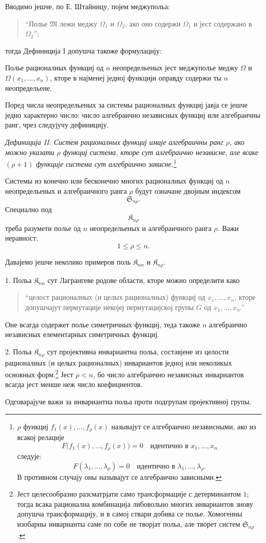 ﻿\documentclass[11pt]{article}
\providecommand{\Kfield}{\mathfrak{K}}
\providecommand{\Ssys}{\mathfrak{S}}
\providecommand{\Mfield}{\mathfrak{M}}
\begin{document}
Вводимо јешче, по Е. Штайницу, појем меджупольа:
\begin{quote}
``Полье $\Mfield$ лежи меджу $\Omega_1$ и $\Omega_2$, ако оно содержи $\Omega_1$ и јест содержано в $\Omega_2$'';
\end{quote}
тогда Дефиниција I допушча такоже формулацију:

Полье рационалных функциј од $n$ неопредельеных јест меджуполье меджу $\Omega$ и $\Omega(x_1,\ldots,x_n)$, кторе в најменеј једној функцији оправду содержи ты $n$ неопредельене.

Поред числа неопредельеных за системы рационалных функциј јавја се јешче једно характерно число: число алгебраично независных функциј или алгебраичны ранг, чрез следујучу дефиницију.

{\itshape Дефиниција II: Систем рационалных функциј имаје алгебраичны ранг $\rho$, ако можно указати $\rho$ функциј система, кторе сут алгебраично независне, але всаке $(\rho+1)$ функције система сут алгебраично зависне.}\footnote{$\rho$ функциј $f_1(x),\ldots,f_\rho(x)$ называјут се алгебраично независными, ако из всакој релације
\[
F\bigl(f_1(x),\ldots,f_\rho(x)\bigr)=0\quad\text{идентично в }x_1,\ldots,x_n
\]
следује:
\[
F(\lambda_1,\ldots,\lambda_\rho)=0\quad\text{идентично в }\lambda_1,\ldots,\lambda_\rho.
\]
В противном случају оны называјут се алгебраично зависными.}

Системы из конечно или бесконечно многих рационалных функциј од $n$ неопредельеных и алгебраичного ранга $\rho$ будут означане двојным индексом
\[
  \Ssys_{n\rho}.
\]
Специално под
\[
  \Kfield_{n\rho}
\]
треба разумети полье од $n$ неопредельеных и алгебраичного ранга $\rho$. Важи неравност:
\[
  1\leq \rho\leq n.
\]

Давајемо јешче неколико примеров поль $\Kfield_{nn}$ и $\Kfield_{n\rho}$.

1. Польа $\Kfield_{nn}$ сут Лагрангеве родове области, кторе можно определити како
\begin{quote}
``целост рационалных (и целых рационалных) функциј од $x_1,\ldots,x_n$, кторе допушчајут пермутације некојеј пермутацијској групы $G$ од $x_1,\ldots,x_n$.''
\end{quote}
Оне всагда содержет полье симетричных функциј, теда такоже $n$ алгебраично независных елементарных симетричных функциј.

2. Польа $\Kfield_{n\rho}$ сут пројективна инвариантна польа, составјене из целости рационалных (и целых рационалных) инвариантов једној или неколикых основных форм.\footnote{Јест целесообразно разсматрјати само трансформације с детерминантом $1$; тогда всака рационална комбинација либовольно многих инвариантов знову допушча трансформацију, и в самој ствари добива се полье. Хомогенны изобарны инварианты саме по собе не творјат польа, але творет систем $\Ssys_{n\rho}$.} Јест $\rho<n$, бо число алгебраично независных инвариантов всагда јест менше неж число коефициентов.

Одговарајуче важи за инвариантна польа проти подгрупам пројективној групы.
\end{document}
